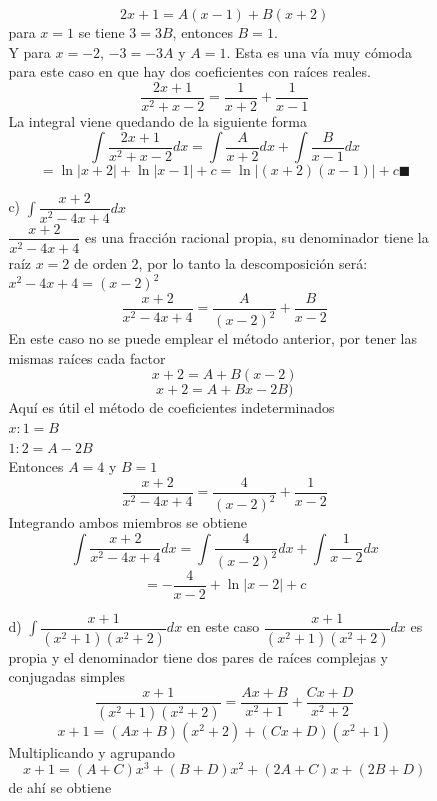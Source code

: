 \documentclass[10pt,twoside]{SelfArx} %
\begin{document}
\begin{enumerate}
\begin{enumerate}
\begin{enumerate}
\[ 2x+1=A(x-1)+B(x+2) \]
para $ x=1 $ se tiene $ 3=3B $, entonces $ B=1 $.\\
Y para $ x=-2 $, $ -3=-3A $ y $ A=1 $. Esta es una vía muy cómoda para este caso en que hay dos coeficientes con raíces reales.
\[ \dfrac{2x+1}{x^{2}+x-2}=\dfrac{1}{x+2}+\dfrac{1}{x-1} \]
La integral viene quedando de la siguiente forma
\begin{equation}
\int\dfrac{2x+1}{x^{2}+x-2}dx=\int\dfrac{A}{x+2}dx+\int\dfrac{B}{x-1} dx
\end{equation}
\begin{equation}
=\ln|x+2|+\ln|x-1|+c=\ln|(x+2)(x-1)|+c\blacksquare
\end{equation}
\item [c)]$ \displaystyle\int\dfrac{x+2}{x^{2}-4x+4}dx $\\
$ \dfrac{x+2}{x^{2}-4x+4} $ es una fracción racional propia, su denominador tiene la raíz $ x=2 $ de orden $ 2 $,  por lo tanto la descomposición será: $ x^{2}-4x+4=(x-2)^{2} $
\begin{equation}
\dfrac{x+2}{x^{2}-4x+4}=\dfrac{A}{(x-2)^{2}}+\dfrac{B}{x-2}
\end{equation}
En este caso no se puede emplear el método anterior, por tener las mismas ra\'ices cada factor
\[ x+2=A+B(x-2) \]
\[ x+2=A+Bx-2B) \]
Aquí es útil el método de coeficientes indeterminados\\
$ x: 1=B $\\
$ 1:2=A-2B $\\
Entonces $ A=4 $ y $ B=1 $
\begin{equation}
\dfrac{x+2}{x^{2}-4x+4}=\dfrac{4}{(x-2)^{2}}+\dfrac{1}{x-2}
\end{equation}
Integrando ambos miembros se obtiene
\begin{equation}
\int\dfrac{x+2}{x^{2}-4x+4}dx=\int\dfrac{4}{(x-2)^{2}}dx+\int\dfrac{1}{x-2}dx
\end{equation}
\begin{equation}
=-\dfrac{4}{x-2}+\ln|x-2|+c
\end{equation}
\item [d)]$ \displaystyle\int \dfrac{x+1}{(x^{2}+1)(x^{2}+2)}dx $
en este caso $ \dfrac{x+1}{(x^{2}+1)(x^{2}+2)}dx $ es propia y el denominador tiene dos pares de ra\'ices complejas y conjugadas simples
\[ \dfrac{x+1}{(x^{2}+1)(x^{2}+2)}=\dfrac{Ax+B}{x^{2}+1}+\dfrac{Cx+D}{x^{2}+2} \]
\[ x+1=(Ax+B)(x^{2}+2)+(Cx+D)(x^{2}+1) \]
Multiplicando y agrupando
\[ x+1=(A+C)x^{3}+(B+D)x^{2}+(2A+C)x+(2B+D) \]
de ahí se obtiene
\[ 
\begin{array}{cccc}

\end{array}\]
\end{enumerate}
\end{enumerate}
\end{enumerate}
\end{document}
